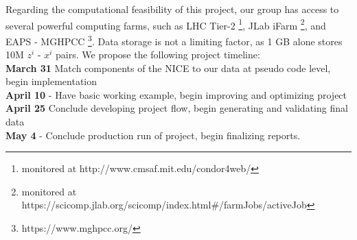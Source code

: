 \documentclass{article}
\begin{document}
Regarding the computational feasibility of this project, our group has access to several powerful computing farms, such as LHC Tier-2 \footnote{monitored at http://www.cmsaf.mit.edu/condor4web/}, JLab iFarm \footnote{monitored at https://scicomp.jlab.org/scicomp/index.html\#/farmJobs/activeJob}, and EAPS - MGHPCC \footnote{https://www.mghpcc.org/}. Data storage is not a limiting factor, as 1 GB alone stores 10M $z^i$ - $x^i$ pairs. We propose the following project timeline:\\
\textbf{March 31} Match components of the NICE to our data at pseudo code level, begin implementation \\
\textbf{April 10} - Have basic working example, begin improving and optimizing project \\ 
\textbf{April 25} Conclude developing project flow, begin generating and validating final data \\
\textbf{May 4} - Conclude production run of project, begin finalizing reports.

\end{document}
